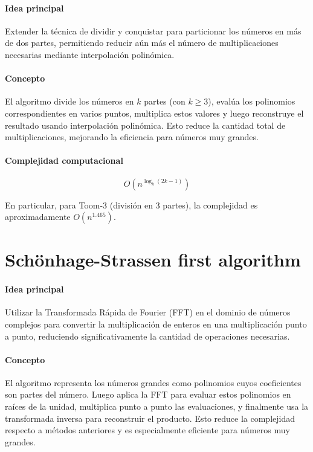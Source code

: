 \paragraph{Idea principal} 
Extender la técnica de dividir y conquistar para particionar los números en más de dos partes, permitiendo reducir aún más el número de multiplicaciones necesarias mediante interpolación polinómica.

\paragraph{Concepto} 
El algoritmo divide los números en \( k \) partes (con \( k \geq 3 \)), evalúa los polinomios correspondientes en varios puntos, multiplica estos valores y luego reconstruye el resultado usando interpolación polinómica. Esto reduce la cantidad total de multiplicaciones, mejorando la eficiencia para números muy grandes.

\paragraph{Complejidad computacional} 
\[
    O\left(n^{\log_{k}(2k - 1)}\right)
\]

En particular, para Toom-3 (división en 3 partes), la complejidad es aproximadamente \( O(n^{1.465}) \).

\section{Sch\"onhage-Strassen first algorithm} 

\paragraph{Idea principal} 
Utilizar la Transformada Rápida de Fourier (FFT) en el dominio de números complejos para convertir la multiplicación de enteros en una multiplicación punto a punto, reduciendo significativamente la cantidad de operaciones necesarias.

\paragraph{Concepto} 
El algoritmo representa los números grandes como polinomios cuyos coeficientes son partes del número. Luego aplica la FFT para evaluar estos polinomios en raíces de la unidad, multiplica punto a punto las evaluaciones, y finalmente usa la transformada inversa para reconstruir el producto. Esto reduce la complejidad respecto a métodos anteriores y es especialmente eficiente para números muy grandes.

